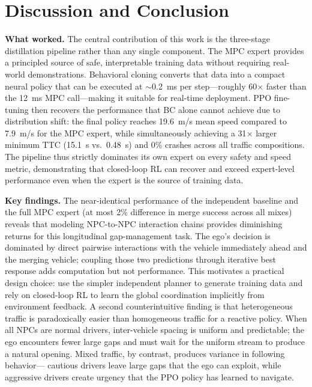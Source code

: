 \documentclass[conference]{IEEEtran}
\begin{document}
\section{Discussion and Conclusion}
\label{sec:discussion}

\textbf{What worked.}
The central contribution of this work is the three-stage distillation pipeline
rather than any single component.
The MPC expert provides a principled source of safe, interpretable training
data without requiring real-world demonstrations.
Behavioral cloning converts that data into a compact neural policy that can be
executed at $\sim$0.2~ms per step---roughly 60$\times$ faster than the
12~ms MPC call---making it suitable for real-time deployment.
PPO fine-tuning then recovers the performance that BC alone cannot achieve
due to distribution shift: the final policy reaches 19.6~m/s mean speed
compared to 7.9~m/s for the MPC expert, while simultaneously achieving a
31$\times$ larger minimum TTC (15.1~s vs.~0.48~s) and 0\% crashes across
all traffic compositions.
The pipeline thus strictly dominates its own expert on every safety and
speed metric, demonstrating that closed-loop RL can recover and exceed
expert-level performance even when the expert is the source of training data.

\textbf{Key findings.}
The near-identical performance of the independent baseline and the full MPC
expert (at most 2\% difference in merge success across all mixes) reveals
that modeling NPC-to-NPC interaction chains provides diminishing returns for
this longitudinal gap-management task.
The ego's decision is dominated by direct pairwise interactions with the
vehicle immediately ahead and the merging vehicle; coupling those two
predictions through iterative best response adds computation but not
performance.
This motivates a practical design choice: use the simpler independent
planner to generate training data and rely on closed-loop RL to learn the
global coordination implicitly from environment feedback.
A second counterintuitive finding is that heterogeneous traffic is
paradoxically easier than homogeneous traffic for a reactive policy.
When all NPCs are normal drivers, inter-vehicle spacing is uniform and
predictable; the ego encounters fewer large gaps and must wait for the
uniform stream to produce a natural opening.
Mixed traffic, by contrast, produces variance in following behavior---
cautious drivers leave large gaps that the ego can exploit, while
aggressive drivers create urgency that the PPO policy has learned to
navigate.
\end{document}
